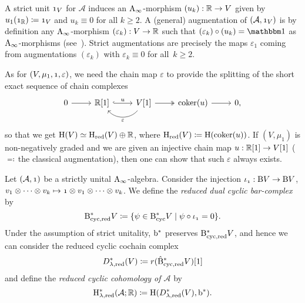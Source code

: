 \documentclass[\MainFolder/Text.tex]{subfiles}
\begin{document}
\begin{Remark}\label{Rem:AugUnit}
\begin{RemarkList}
\item A strict unit $\NOne_V$ for $\mathcal{A}$ induces an $\mathrm{A}_\infty$-morphism $(u_k): \mathbb{R} \rightarrow V$ given by $u_1(\NOne_\R)\coloneqq \NOne_V$ and $u_k \equiv 0$ for all $k\ge 2$. A (general) augmentation of $(\mathcal{A},\NOne_V)$ is by definition any $\mathrm{A}_\infty$-morphism $(\varepsilon_k): V \rightarrow \mathbb{R}$ such that $(\varepsilon_k) \circ (u_k) = \Id$ as $\mathrm{A}_\infty$-morphisms (see~\cite{Keller1999}). Strict augmentations are precisely the maps $\varepsilon_1$ coming from augmentations $(\varepsilon_k)$ with $\varepsilon_k \equiv 0$ for all~$k\ge 2$.

\item As for $(V,\mu_1,\NOne,\varepsilon)$, we need the chain map $\varepsilon$ to provide the splitting of the short exact sequence of chain complexes
$$\begin{tikzcd}
0 \arrow{r} & \R[1] \arrow[hook]{r}{u} & \arrow[bend left=50]{l}{\varepsilon} V[1] \arrow[two heads]{r} & \coker(u) \arrow{r} & 0,
\end{tikzcd}$$
so that we get $\mathrm{H}(V) \simeq \mathrm{H}_{\mathrm{red}}(V)\oplus \mathbb{R}$, where $\mathrm{H}_{\mathrm{red}}(V)\coloneqq \mathrm{H}(\operatorname{\mathrm{coker}}(u))$. If $(V,\mu_1)$ is non-negatively graded and we are given an injective chain map $u: \mathbb{R}[1] \rightarrow V[1]$ ($\eqqcolon$\,the classical augmentation), then one can show that such $\varepsilon$ always exists. \qedhere
\end{RemarkList}
\end{Remark}

\begin{Definition}\label{Def:ReducedDual}
Let $(\mathcal{A}, \NOne)$ be a strictly unital $\mathrm{A}_\infty$-algebra. Consider the injection $\iota_{\NOne}: \B V \rightarrow \B V$, $v_1 \otimes \dotsb \otimes v_k \mapsto \NOne \otimes v_1 \otimes \dotsb \otimes v_k$. We define the \emph{reduced dual cyclic bar-complex} by
$$ \RedDBCyc V \coloneqq \{\psi \in \DBCyc V \mid \psi\circ \iota_{\NOne} = 0\}. $$
Under the assumption of strict unitality, $\mathrm{b}^*$ preserves $\mathrm{B}_{\mathrm{cyc},\mathrm{red}}^* V$, and hence we can consider the reduced cyclic cochain complex 
$$ D_{\lambda,\mathrm{red}}^*(V) \coloneqq r(\hat{\mathrm{B}}^*_{\mathrm{cyc},\mathrm{red}} V)[1]$$
and define the \emph{reduced cyclic cohomology of $\mathcal{A}$} by
$$ \mathrm{H}_{\lambda, \mathrm{red}}^*(\mathcal{A};\mathbb{R})\coloneqq \mathrm{H}(D_{\lambda, \mathrm{red}}^*(V), \mathrm{b}^*). $$ 
\end{Definition}
\end{document}
